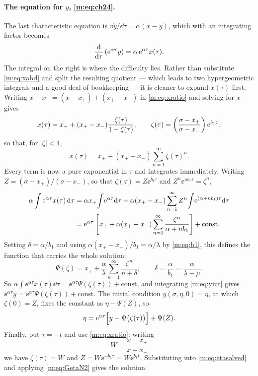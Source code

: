\paragraph{The equation for $y$, \eqref{m:eq:ch24}.}
The last characteristic equation is $\dd y/\dd\tau = \alpha(x-y)$, which with an
integrating factor becomes
\begin{equation}
\label{m:eq:yint}
\frac{\mathrm{d} }{\mathrm{d} \tau}\left(\mathrm{e}^{\alpha\tau}y\right) = \alpha\,\mathrm{e}^{\alpha\tau}x(\tau) .
\end{equation}
The integral on the right is where the difficulty lies. Rather than substitute
\cref{m:eq:xabd} and split the resulting quotient --- which leads to two
hypergeometric integrals and a good deal of bookkeeping --- it is cleaner to expand
$x(\tau)$ first. Writing $x-x_- = (x-x_+)+(x_+-x_-)$ in \cref{m:eq:xratio} and
solving for $x$ gives
\begin{equation}
\label{m:eq:xgeom}
x(\tau) = x_+ + (x_+-x_-)\frac{\zeta(\tau)}{1-\zeta(\tau)},
\qquad
\zeta(\tau) = \left(\frac{\sigma-x_+}{\sigma-x_-}\right)\mathrm{e}^{b_1\tau},
\end{equation}
so that, for $|\zeta|<1$,
\begin{equation*}
x(\tau) = x_+ + (x_+-x_-)\sum_{n=1}^{\infty}\zeta(\tau)^n .
\end{equation*}
Every term is now a pure exponential in $\tau$ and integrates immediately. Writing
$Z = (\sigma-x_+)/(\sigma-x_-)$, so that $\zeta(\tau) = Z\ee^{b_1\tau}$ and
$Z^n\ee^{nb_1\tau} = \zeta^n$,
\begin{align*}
\alpha\int\mathrm{e}^{\alpha\tau}x(\tau)\,\mathrm{d}\tau
&= \alpha x_+\!\int\!\mathrm{e}^{\alpha\tau}\mathrm{d}\tau
 + \alpha(x_+-x_-)\sum_{n=1}^{\infty}Z^n\!\int\!\mathrm{e}^{(\alpha+nb_1)\tau}\mathrm{d}\tau\\
&= \mathrm{e}^{\alpha\tau}\left[x_+ + \alpha(x_+-x_-)\sum_{n=1}^{\infty}\frac{\zeta^n}{\alpha+nb_1}\right]
 + \text{const} .
\end{align*}
Setting $\delta = \alpha/b_1$ and using $\alpha(x_+-x_-)/b_1 = \alpha/\lambda$ by
\cref{m:eq:b1}, this defines the function that carries the whole solution:
\begin{equation}
\label{m:eq:Psidef}
\Psi(\zeta) = x_+ + \frac{\alpha}{\lambda}\sum_{n=1}^{\infty}\frac{\zeta^{\,n}}{n+\delta},
\qquad
\delta = \frac{\alpha}{b_1} = \frac{\alpha}{\lambda-\mu} .
\end{equation}
So $\alpha\int\ee^{\alpha\tau}x(\tau)\dd\tau = \ee^{\alpha\tau}\Psi(\zeta(\tau)) + \text{const}$,
and integrating \cref{m:eq:yint} gives
$\ee^{\alpha\tau}y = \ee^{\alpha\tau}\Psi(\zeta(\tau)) + \text{const}$. The initial
condition $y(\sigma,\eta,0)=\eta$, at which $\zeta(0)=Z$, fixes the constant as
$\eta-\Psi(Z)$, so
\begin{equation}
\label{m:eq:etasolved}
\eta = \mathrm{e}^{\alpha\tau}\Bigl[y-\Psi\bigl(\zeta(\tau)\bigr)\Bigr] + \Psi(Z) .
\end{equation}
Finally, put $\tau=-t$ and use \cref{m:eq:xratio}: writing
\begin{equation*}
W = \frac{x-x_+}{x-x_-}
\end{equation*}
we have $\zeta(\tau) = W$ and $Z = W\ee^{-b_1\tau} = W\ee^{b_1t}$. Substituting into
\cref{m:eq:etasolved} and applying \cref{m:eq:GetaN2} gives the solution.

